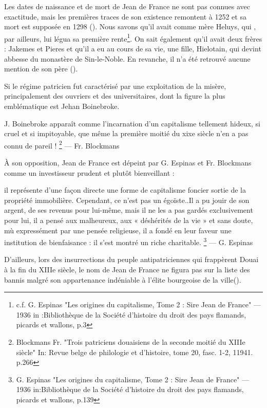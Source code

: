 Les dates de naissance et de mort de Jean de France ne sont pas connues avec exactitude, mais les premières traces de son existence remontent à 1252 et sa mort est supposée en 1298 (\cite{espinas_les_1933}). Nous savons qu'il avait comme mère Heluys, qui , par ailleurs, lui légua sa première rente\footnote{c.f. G. Espinas "Les origines du capitalisme, Tome 2 : Sire Jean de France" — 1936 in :Bibliothèque de la Société
d’histoire du droit des pays flamands, picards et wallons, p.3}.
On sait également qu'il  avait deux frères : Jakemes et Pieres et qu'il a eu au cours de sa vie, une fille, Hielotain, qui devint abbesse du monastère de Sin-le-Noble. En revanche, il n'a été retrouvé aucune mention de son père (\cite{espinas_les_1933}).

Si le régime patricien fut caractérisé par une exploitation de la misère, principalement des ouvriers et des universitaires, dont la figure la plus emblématique est Jehan Boinebroke. 
\begin{displayquote} 
    \og J. Boinebroke apparaît comme l'incarnation d'un capitalisme tellement hideux, si cruel et si impitoyable, que même la première moitié du xixe siècle n'en a pas connu de pareil ! \fg{}\footnote{ Blockmans Fr. "Trois patriciens douaisiens de la seconde moitié du XIIIe siècle" In: Revue belge de philologie et d'histoire, tome 20, fasc. 1-2, 11941. p.266} — Fr. Blockmans
\end{displayquote}
\vspace{0,5cm}
À son opposition, Jean de France est dépeint par G. Espinas et Fr. Blockmans comme un investisseur prudent et plutôt bienveillant :
\begin{displayquote}
    \og [...] il représente d’une façon directe une forme de capitalisme foncier sortie de la propriété immobilière. Cependant, ce n’est pas un égoïste..Il a pu jouir de son argent, de ses revenus pour lui-même, mais il ne les a pas gardés exclusivement pour lui, il a pensé aux malheureux, aux « déshérités de la vie » et sans doute, mù expressément par une pensée religieuse, il a fondé en leur faveur une institution de bienfaisance : il s’est montré un riche charitable.\fg{} 
    \footnote{ G. Espinas "Les origines du capitalisme, Tome 2 : Sire Jean de France" — 1936 in:Bibliothèque de la Société d'histoire du droit des pays flamands, picards et wallons, p.139 } — G. Espinas
\end{displayquote} 
\vspace{0,5cm}
D'ailleurs, lors des insurrections du peuple antipatriciennes qui frappèrent Douai à la fin du XIIIe siècle, le nom de Jean de France ne figura pas sur la liste des bannis malgré son appartenance indéniable à l'élite bourgeoise de la ville(\cite{espinas_les_1933}).

